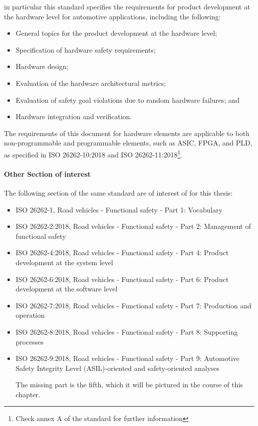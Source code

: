 \documentclass[./dissertation.tex]{subfiles}
\begin{document}
in particular this standard specifies the requirements for product development at the hardware level for automotive applications, including the following:
\begin{itemize}
\item General topics for the product development at the hardware level;
\item Specification of hardware safety requirements;
\item Hardware design;
\item Evaluation of the hardware architectural metrics;
\item Evaluation of safety goal violations due to random hardware failures; and
\item Hardware integration and verification.
\end{itemize}
The requirements of this document for hardware elements are applicable to both non-programmable and programmable elements, such as ASIC, FPGA, and PLD, as specified in ISO 26262-10:2018 and ISO 26262-11:2018\footnote{Check annex A of the standard for further information}.


\paragraph{Other Section of interest}
The following section of the same standard are of interest of for this thesis:
\begin{itemize}
\item ISO 26262-1, Road vehicles - Functional safety - Part 1: Vocabulary
\item ISO 26262-2:2018, Road vehicles - Functional safety - Part 2: Management of functional safety
\item ISO 26262-4:2018, Road vehicles - Functional safety - Part 4: Product development at the system level
\item ISO 26262-6:2018, Road vehicles - Functional safety - Part 6: Product development at the software level
\item ISO 26262-7:2018, Road vehicles - Functional safety - Part 7: Production and operation
\item ISO 26262-8:2018, Road vehicles - Functional safety - Part 8: Supporting processes
\item ISO 26262-9:2018, Road vehicles - Functional safety - Part 9: Automotive Safety Integrity Level (ASIL)-oriented and safety-oriented analyses

The missing part is the fifth, which it will be pictured in the course of this chapter.
\end{itemize}
\end{document}
